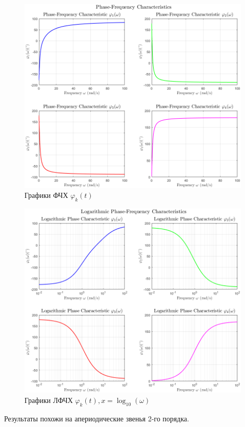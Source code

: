 \documentclass[a4paper, 12pt]{article}
\begin{document}
    \begin{figure}[H]
        \centering
        \includegraphics[scale=0.585]{1task_phii.png}
        \captionsetup{skip=0pt}
        \caption{Графики ФЧХ $\varphi_k(t)$}
        \label{fig:1task_phii}
    \end{figure}
    \begin{figure}[H]
        \centering
        \includegraphics[scale=0.585]{1task_lphii.png}
        \captionsetup{skip=0pt}
        \caption{Графики ЛФЧХ $\varphi_k(t),x=\log_{10}\left( \omega \right)$}
        \label{fig:1task_lphii}
    \end{figure}
    \noindent Результаты похожи на апериодические звенья 2-го порядка.
\end{document}
